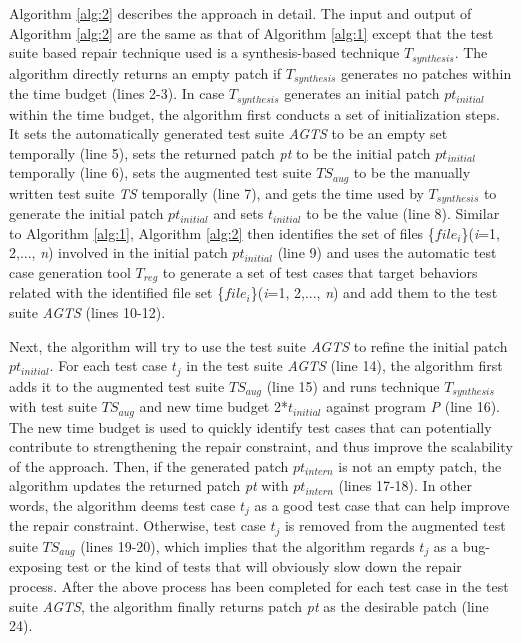 \documentclass[]{sig-alternate}
\begin{document}
Algorithm \autoref{alg:2} describes the approach in detail. The input and output of Algorithm \autoref{alg:2} are the same as that of Algorithm \autoref{alg:1} except that the test suite based repair technique used is a synthesis-based technique $T_{synthesis}$. The algorithm directly returns an empty patch if $T_{synthesis}$ generates no patches within the time budget (lines 2-3). In case $T_{synthesis}$ generates an initial patch $pt_{initial}$ within the time budget, the algorithm first conducts a set of initialization steps. It sets the automatically generated test suite \emph{AGTS} to be an empty set temporally (line 5), sets the returned patch \emph{pt} to be the initial patch $pt_{initial}$ temporally (line 6), sets the augmented test suite $TS_{aug}$ to be the manually written test suite \emph{TS} temporally (line 7), and gets the time used by $T_{synthesis}$ to generate the initial patch $pt_{initial}$ and sets $t_{initial}$ to be the value (line 8). Similar to Algorithm \autoref{alg:1}, Algorithm \autoref{alg:2} then identifies the set of files \{$file_i$\}(\emph{i}=1, 2,..., \emph{n}) involved in the initial patch $pt_{initial}$ (line 9) and uses the automatic test case generation tool $T_{reg}$ to generate a set of test cases that target behaviors related with the identified file set \{$file_i$\}(\emph{i}=1, 2,..., \emph{n}) and add them to the test suite \emph{AGTS} (lines 10-12). 

Next, the algorithm will try to use the test suite \emph{AGTS} to refine the initial patch $pt_{initial}$. For each test case $t_j$ in the test suite \emph{AGTS} (line 14), the algorithm first adds it to the augmented test suite $TS_{aug}$ (line 15) and runs technique $T_{synthesis}$ with test suite $TS_{aug}$ and new time budget 2*$t_{initial}$ against program \emph{P} (line 16). The new time budget is used to quickly identify test cases that can potentially contribute to strengthening the repair constraint, and thus improve the scalability of the approach. Then, if the generated patch $pt_{intern}$ is not an empty patch, the algorithm updates the returned patch \emph{pt} with $pt_{intern}$ (lines 17-18). In other words, the algorithm deems test case $t_j$ as a good test case that can help improve the repair constraint. Otherwise, test case $t_j$ is removed from the augmented test suite $TS_{aug}$ (lines 19-20), which implies that the algorithm regards $t_j$ as a bug-exposing test or the kind of tests that will obviously slow down the repair process. After the above process has been completed for each test case in the test suite \emph{AGTS}, the algorithm finally returns patch \emph{pt} as the desirable patch (line 24). 
\end{document}
